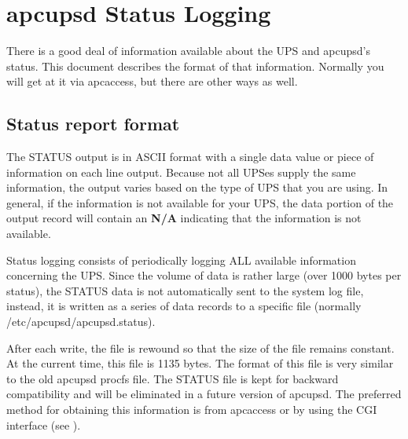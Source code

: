 {{{{{{{{\label{apcupsd-Status-Logging}

\section*{apcupsd Status Logging}

\label{index-Logging_002c-Status-250}
\label{index-Status-logging-251}
There is a good deal of information available about the UPS and apcupsd's
status. This document describes the format of that information.  Normally you
will get at it via apcaccess, but there are other ways as well. 

\label{Status-report-format}

\subsection*{Status report format}

\label{index-Status-Report-252}
\label{index-Report_002c-Status-253}
The STATUS output is in ASCII format with a single data value or piece of
information on each line output. Because not all UPSes supply the same
information, the output varies based on the type of UPS that you are using. In
general, if the information is not available for your UPS, the data portion of
the output record will contain an {\bf N/A} indicating that the information is
not available.  

Status logging consists of periodically logging ALL available information
concerning the UPS. Since the volume of data is rather large (over 1000 bytes
per status), the STATUS data is not automatically sent to the system log file,
instead, it is written as a series of data records to a specific file
(normally /etc/apcupsd/apcupsd.status).  

After each write, the file is rewound so that the size of the file remains
constant. At the current time, this file is 1135 bytes. The format of this
file is very similar to the old apcupsd procfs file. The STATUS file is kept
for backward compatibility and will be eliminated in a future version of
apcupsd. The preferred method for obtaining this information is from apcaccess
or by using the CGI interface (see 
).  

}}}}}}}}
